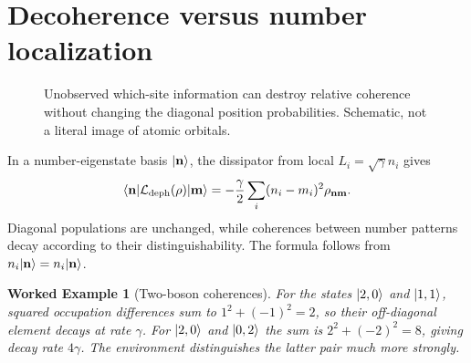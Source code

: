 \documentclass[11pt,a4paper]{article}
\newtheorem{example}{Worked Example}\newtheorem{remark}{Physical qualification}
\begin{document}
\section{Decoherence versus number localization}
\begin{figure}[ht]\centering
{}
\caption{Unobserved which-site information can destroy relative coherence without changing the diagonal position probabilities. Schematic, not a literal image of atomic orbitals.}
\end{figure}
In a number-eigenstate basis $|\mathbf n\rangle$, the dissipator from local $L_i=\sqrt\gamma n_i$ gives
\begin{equation}\label{eq:manydephasing}
\langle\mathbf n|\mathcal L_\mathrm{deph}(\rho)|\mathbf m\rangle
=-\frac\gamma2\sum_i(n_i-m_i)^2\rho_{\mathbf n\mathbf m}.
\end{equation}
Diagonal populations are unchanged, while coherences between number patterns decay according to their distinguishability. The formula follows from $n_i|\mathbf n\rangle=n_i|\mathbf n\rangle$.
\begin{example}[Two-boson coherences]
For the states $|2,0\rangle$ and $|1,1\rangle$, squared occupation differences sum to $1^2+(-1)^2=2$, so their off-diagonal element decays at rate $\gamma$. For $|2,0\rangle$ and $|0,2\rangle$ the sum is $2^2+(-2)^2=8$, giving decay rate $4\gamma$. The environment distinguishes the latter pair much more strongly.
\end{example}
\end{document}

